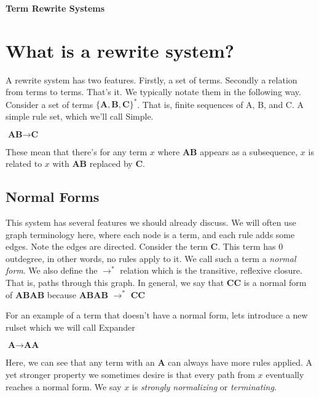 \documentclass[12pt]{article}
\begin{document}
\baselineskip 12pt

\begin{center}
\textbf{\Large Term Rewrite Systems} \\
\end{center}

\section{What is a rewrite system?}
A rewrite system has two features.
Firstly, a set of terms. Secondly a relation from terms to terms. That's it. 
We typically notate them in the following way.
Consider a set of terms $\{\textbf{A},\textbf{B},\textbf{C}\}^*$.
That is, finite sequences of A, B, and C.
A simple rule set, which we'll call Simple.
\begin{description}
    \item $\textbf{AB} \rightarrow \textbf{C}$
\end{description}

These mean that there's for any term $x$ where \textbf{AB} appears as a subsequence, 
$x$ is related to $x$ with \textbf{AB} replaced by \textbf{C}.


\subsection{Normal Forms}
This system has several features we should already discuss.
We will often use graph terminology here, where each node is a term, and each rule adds some edges. 
Note the edges are directed.
Consider the term \textbf{C}.
This term has 0 outdegree, in other words, no rules apply to it.
We call such a term a \textit{normal form}. 
We also define the $\rightarrow^*$ relation which is the transitive, reflexive closure.
That is, paths through this graph.
In general, we say that \textbf{CC} is a normal form of \textbf{ABAB} because
\textbf{ABAB} $\rightarrow^*$ \textbf{CC}

For an example of a term that doesn't have a normal form, lets introduce a new rulset which we will call Expander
\begin{description}
    \item $\textbf{A} \rightarrow \textbf{AA}$
\end{description}

\noindent Here, we can see that any term with an \textbf{A} can always have more rules applied. A yet stronger property we sometimes desire is that every path from $x$ eventually reaches a normal form. 
We say $x$ is \textit{strongly normalizing} or \textit{terminating}.
\end{document}
